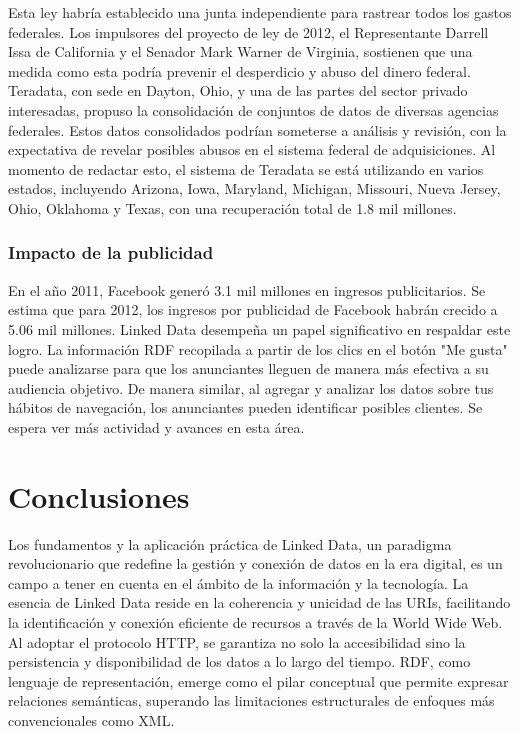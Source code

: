 \documentclass[11pt]{report}
\begin{document}
        Esta ley habría establecido una junta independiente para rastrear todos los gastos federales. Los impulsores del proyecto de ley de 2012, el Representante Darrell Issa de California y el Senador Mark Warner de Virginia, sostienen que una medida como esta podría prevenir el desperdicio y abuso del dinero federal. Teradata, con sede en Dayton, Ohio, y una de las partes del sector privado interesadas, propuso la consolidación de conjuntos de datos de diversas agencias federales. Estos datos consolidados podrían someterse a análisis y revisión, con la expectativa de revelar posibles abusos en el sistema federal de adquisiciones. Al momento de redactar esto, el sistema de Teradata se está utilizando en varios estados, incluyendo Arizona, Iowa, Maryland, Michigan, Missouri, Nueva Jersey, Ohio, Oklahoma y Texas, con una recuperación total de 1.8 mil millones.

\subsection*{Impacto de la publicidad}

		En el año 2011, Facebook generó 3.1 mil millones en ingresos publicitarios. Se estima que para 2012, los ingresos por publicidad de Facebook habrán crecido a 5.06 mil millones. Linked Data desempeña un papel significativo en respaldar este logro. La información RDF recopilada a partir de los clics en el botón "Me gusta" puede analizarse para que los anunciantes lleguen de manera más efectiva a su audiencia objetivo. De manera similar, al agregar y analizar los datos sobre tus hábitos de navegación, los anunciantes pueden identificar posibles clientes. Se espera ver más actividad y avances en esta área.

\chapter{Conclusiones}
Los fundamentos y la aplicación práctica de Linked Data, un paradigma revolucionario que redefine la gestión y conexión de datos en la era digital, es un campo a tener en cuenta en el ámbito de la información y la tecnología. La esencia de Linked Data reside en la coherencia y unicidad de las URIs, facilitando la identificación y conexión eficiente de recursos a través de la World Wide Web. Al adoptar el protocolo HTTP, se garantiza no solo la accesibilidad sino la persistencia y disponibilidad de los datos a lo largo del tiempo. RDF, como lenguaje de representación, emerge como el pilar conceptual que permite expresar relaciones semánticas, superando las limitaciones estructurales de enfoques más convencionales como XML.
\end{document}
